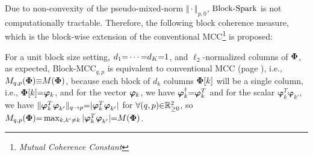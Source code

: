
Due to non-convexity of the 
pseudo-mixed-norm $\Vert \cdot \Vert_{p,0}$, $\mathrm{Block\text{{-}}Spark}$ is not computationally tractable.
Therefore, the following 
block coherence measure, which is the block-wise extension of the conventional MCC\footnote{\emph{Mutual Coherence Constant}} is proposed:
\newpage


For a unit block size setting, $d_1 {=} \cdots {=} d_K {=} 1$, and $\ell_2$-normalized columns of $\boldsymbol{\Phi}$, as expected, Block-MCC$_{q,p}$ is equivalent to conventional MCC (page \pageref{eq:MIC}), i.e., $M_{q,p}(\boldsymbol{\Phi}) {\equiv} M(\boldsymbol{\Phi})$, because each block of $d_k$ columns $\boldsymbol{\Phi}[k]$ will be a single column, i.e., $\boldsymbol{\Phi}[k] {=} \boldsymbol{\varphi}_k$, and for the vector $\boldsymbol{\varphi}_k$, we have $\boldsymbol{\varphi}^\dagger_k {=} \boldsymbol{\varphi}^T_k$ and for the scalar $\boldsymbol{\varphi}^T_k \boldsymbol{\varphi}^{ }_{k'}$, we have $\Vert \boldsymbol{\varphi}^T_k \boldsymbol{\varphi}^{ }_{k'} \Vert_{q \to p} {=} \vert \boldsymbol{\varphi}^T_k \boldsymbol{\varphi}^{ }_{k'} \vert$ for $\forall (q , p) {\in}  \mathbb{R}^2_{{\geq} 0}$, so $M_{q,p}(\boldsymbol{\Phi}) {=} \max_{k , k' {\neq} k} \vert \boldsymbol{\varphi}^T_k \boldsymbol{\varphi}^{ }_{k'} \vert {=} M(\boldsymbol{\Phi})$.

